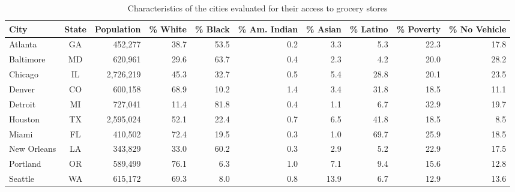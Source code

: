 \documentclass[final,3p,times,onecolumn,sort&compress]{elsarticle}
\begin{document}
\begin{table}[h]
\small
\caption{Characteristics of the cities evaluated for their access to grocery stores}
\label{tab:city_dem}
\centering
\begin{tabular}{l c r r r r r r r r} 
    \hline
    City & State & Population & \% White & \% Black & \% Am. Indian & \% Asian & \% Latino & \% Poverty & \% No Vehicle \\
    \hline
    Atlanta     & GA & 452,277  & 38.7 & 53.5 & 0.2 & 3.3  & 5.3  & 22.3 & 17.8\\
    Baltimore   & MD & 620,961  & 29.6 & 63.7 & 0.4 & 2.3  & 4.2  & 20.0 & 28.2\\
    Chicago     & IL & 2,726,219 & 45.3 & 32.7 & 0.5 & 5.4  & 28.8 & 20.1 & 23.5\\
    Denver      & CO & 600,158  & 68.9 & 10.2 & 1.4 & 3.4  & 31.8 & 18.5 & 11.1\\
    Detroit     & MI & 727,041  & 11.4 & 81.8 & 0.4 & 1.1  & 6.7  & 32.9 & 19.7\\
    Houston     & TX & 2,595,024 & 52.1 & 22.4 & 0.7 & 6.5  & 41.8 & 18.5 &8.5\\
    Miami       & FL & 410,502  & 72.4 & 19.5 & 0.3 & 1.0  & 69.7 &25.9	& 18.5\\
    New Orleans & LA & 343,829  & 33.0 & 60.2 & 0.3 & 2.9  & 5.2  & 22.9 & 17.5\\
    Portland    & OR & 589,499  & 76.1 & 6.3  & 1.0 & 7.1  & 9.4  &15.6	&12.8\\
    Seattle     & WA & 615,172  & 69.3 & 8.0  & 0.8 & 13.9 & 6.7  &12.9	&13.6\\
    \hline
\end{tabular}
\end{table}
\end{document}
